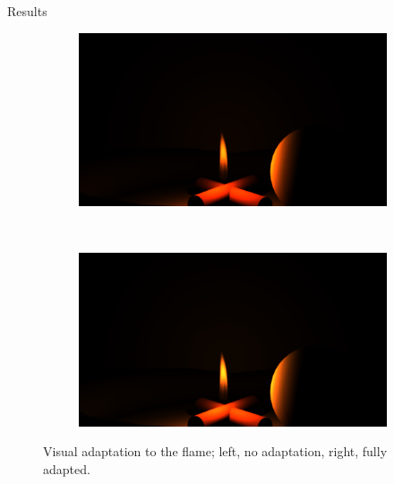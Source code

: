 \documentclass{beamer}
\begin{document}
\begin{frame}[allowframebreaks]{Results}
\begin{figure}[p]
        \centering
        \begin{subfigure}[b]{0.25\textwidth}
                \includegraphics[width=\textwidth, trim={14.5cm 2.5cm 16.5cm 10.5cm}, clip]{img/result_propane_shadows}
        \end{subfigure}%
        ~ 
        \begin{subfigure}[b]{0.25\textwidth}
                \includegraphics[width=\textwidth, trim={14.5cm 2.5cm 16.5cm 10.5cm}, clip]{img/result_propane_1_v}
        \end{subfigure}%
        \caption*{Visual adaptation to the flame; left, no adaptation, right, fully adapted.}
\end{figure}

\end{frame}
\end{document}
